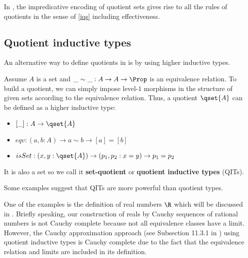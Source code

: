 \begin{theorem}
In \hott, the impredicative encoding of quotient sets gives rise to all the rules of quotients in the sense of \ref{iqs} including effectiveness.
\end{theorem}

\subsection{Quotient inductive types}



An alternative way to define quotients in \hott is by using higher inductive types.


Assume $A$ is a set and $\_\sim\_ : A \to A \to \Prop$ is an equivalence relation. 
To build a quotient, we can simply impose level-$1$ morphisms in the structure of given sets according to the equivalence relation.
Thus, a quotient $\qset{A}$ can be defined as a higher inductive type:

\begin{itemize}
\item $[\_] : A \rightarrow \qset{A}$
\item $eqv : (a,b : A) \rightarrow a \sim b \rightarrow  [a] = [b]$
\item $isSet : (x,y:\qset{A}) \rightarrow (p_1,p_2 : x = y) \rightarrow p_1 = p_2$
\end{itemize}

It is also a set so we call it \textbf{set-quotient} or \textbf{quotient inductive types} (QITs).


Some examples suggest that QITs are more powerful than quotient types.

One of the examples is the definition of real numbers $\R$ which will be discussed in . Briefly speaking, our construction of reals by Cauchy sequences of rational numbers is not Cauchy complete because not all  equivalence classes have a limit. However, the Cauchy approximation approach (see Subsection 11.3.1 in \cite{hott}) using quotient inductive types is Cauchy complete due to the fact that the equivalence relation and limits are included in its definition.


